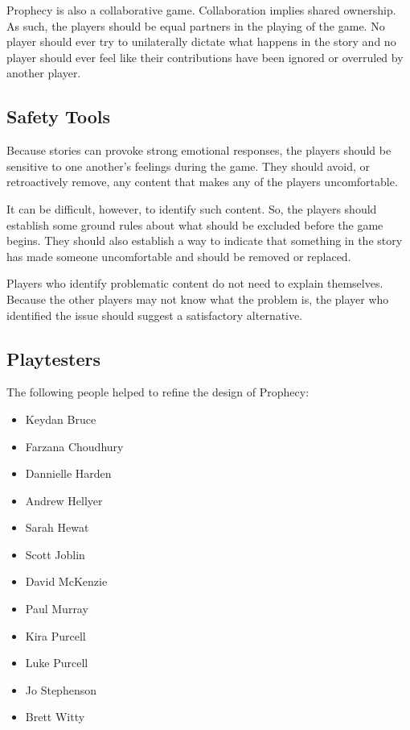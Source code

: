 \documentclass[12pt, a5paper, parskip=half-, footheight=1.4cm]{scrartcl}
\begin{document}
Prophecy is also a collaborative game.
Collaboration implies shared ownership.
As such, the players should be equal partners in the playing of the game.
No player should ever try to unilaterally dictate what happens in the story and no player should ever feel like their contributions have been ignored or overruled by another player.

\subsection*{Safety Tools} \label{subsection:safety-tools}
Because stories can provoke strong emotional responses, the players should be sensitive to one another's feelings during the game.
They should avoid, or retroactively remove, any content that makes any of the players uncomfortable.

It can be difficult, however,  to identify such content. 
So, the players should establish some ground rules about what should be excluded before the game begins. 
They should also establish a way to indicate that something in the story has made someone uncomfortable and should be removed or replaced.

Players who identify problematic content do not need to explain themselves.
Because the other players may not know what the problem is, the player who identified the issue should suggest a satisfactory alternative.

\newpage

\subsection*{Playtesters} \label{subsection:playtesters}
The following people helped to refine the design of Prophecy:\vspace{-1.75ex}
\begin{multicols}{2}
\begin{itemize}
  \item Keydan Bruce
  \item Farzana Choudhury
  \item Dannielle Harden
  \item Andrew Hellyer
  \item Sarah Hewat
  \item Scott Joblin
  \item David McKenzie
  \item Paul Murray
  \item Kira Purcell
  \item Luke Purcell
  \item Jo Stephenson
  \item Brett Witty
\end{itemize}
\end{multicols}
\end{document}
